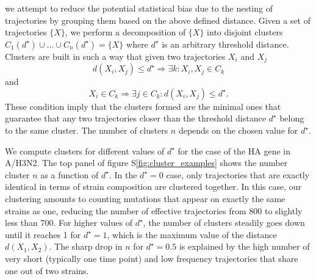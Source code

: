 \documentclass[reprint,amsmath,amssymb,superscriptaddress,showpacs,rmp]{revtex4-1}
\newcommand{\sref}[1]{S\ref{#1}}
\begin{document}
we attempt to reduce the potential statistical bias due to the nesting of trajectories by grouping them based on the above defined distance.
Given a set of trajectories $\{X\}$, we perform a decomposition of $\{X\}$ into disjoint clusters $C_1(d^\star)\cup\ldots\cup C_n(d^\star)=\{X\}$ where $d^\star$ is an arbitrary threshold distance.
Clusters are built in such a way that given two trajectories $X_i$ and $X_j$
$$ d(X_i,X_j) \leq d^\star \Rightarrow \exists k: X_i,X_j\in C_k $$
and
$$ X_i\in C_k \Rightarrow \exists j\in C_k: d(X_i,X_j) \leq d^\star. $$
These condition imply that the clusters formed are the minimal ones that guarantee that any two trajectories closer than the threshold distance $d^\star$ belong to the same cluster.
The number of clusters $n$ depends on the chosen value for $d^\star$.

We compute clusters for different values of $d^\star$ for the case of the HA gene in A/H3N2.
The top panel of figure \sref{fig:cluster_examples} shows the number cluster $n$ as a function of $d^\star$.
In the $d^\star=0$ case, only trajectories that are exactly identical in terms of strain composition are clustered together.
In this case, our clustering amounts to counting mutations that appear on exactly the same strains as one, reducing the number of effective trajectories from 800 to slightly less than 700.
For higher values of $d^\star$, the number of clusters steadily goes down until it reaches 1 for $d^\star=1$, which is the maximum value of the distance $d(X_1,X_2)$.
The sharp drop in $n$ for $d^\star=0.5$ is explained by the high number of very short (typically one time point) and low frequency trajectories that share one out of two strains.
\end{document}
